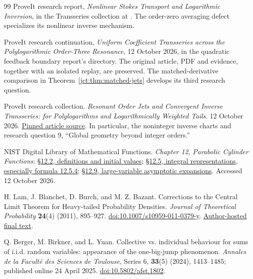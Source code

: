 \begin{thebibliography}{99}
ProveIt research report, \emph{Nonlinear Stokes Transport and Logarithmic
Inversion}, in the Transseries collection at
.
The order-zero averaging defect specializes its nonlinear inverse mechanism.


ProveIt research continuation, \emph{Uniform Coefficient Transseries across
the Polylogarithmic Order-Three Resonance}, 12 October 2026, in the quadratic
feedback boundary report's 
directory. The original article, PDF and evidence, together with an isolated
replay, are preserved. The matched-derivative comparison in
Theorem~\ref{jct:thm:matched-jets} develops its third research question.

ProveIt research collection.
\emph{Resonant Order Jets and Convergent Inverse Transseries:
for Polylogarithms and Logarithmically Weighted Tails}.
12 October 2026.
\href{https://github.com/VladimirReshetnikov/ProveIt/blob/8f5afd4d7565df808359f6a0c22f87f79a119bb9/Analysis/Transseries/docs/series-and-transseries/Polylogarithm_Resonance_And_Inverse_Transseries/polylogarithm_resonance_and_inverse_transseries.tex}{Pinned article source}.
In particular, the noninteger inverse charts and research question 9,
``Global geometry beyond integer orders.''

NIST Digital Library of Mathematical Functions.
\emph{Chapter 12, Parabolic Cylinder Functions}:
\href{https://dlmf.nist.gov/12.2}{\S12.2, definitions and initial values};
\href{https://dlmf.nist.gov/12.5}{\S12.5, integral representations,
especially formula 12.5.4};
\href{https://dlmf.nist.gov/12.9}{\S12.9, large-variable asymptotic expansions}.
Accessed 12 October 2026.

H. Lam, J. Blanchet, D. Burch, and M. Z. Bazant.
Corrections to the Central Limit Theorem for Heavy-tailed Probability
Densities.
\emph{Journal of Theoretical Probability} \textbf{24}(4) (2011),
895--927.
\href{https://doi.org/10.1007/s10959-011-0379-y}{doi:10.1007/s10959-011-0379-y}.
\href{https://www.columbia.edu/~khl2114/files/LBBB.pdf}{Author-hosted final text}.

Q. Berger, M. Birkner, and L. Yuan.
Collective vs. individual behaviour for sums of i.i.d. random variables:
appearance of the one-big-jump phenomenon.
\emph{Annales de la Facult\'e des Sciences de Toulouse}, Series 6,
\textbf{33}(5) (2024), 1413--1485; published online 24 April 2025.
\href{https://afst.centre-mersenne.org/articles/10.5802/afst.1802/}{doi:10.5802/afst.1802}.




\end{thebibliography}

